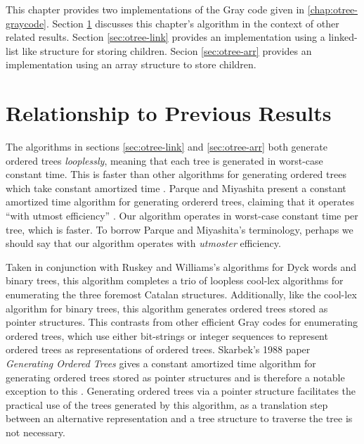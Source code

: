 This chapter provides two implementations of the Gray code given in \ref{chap:otree-graycode}.  
Section \ref{sec:relationship-loopless} discusses this chapter's algorithm in the context of other related results.  Section \ref{sec:otree-link} provides an implementation using a linked-list like structure for storing children.  Secion \ref{sec:otree-arr} provides an implementation using an array structure to store children.  


\section{Relationship to Previous Results}\label{sec:relationship-loopless}
The algorithms in sections \ref{sec:otree-link} and \ref{sec:otree-arr} both generate ordered trees \emph{looplessly}, meaning that each tree is generated in worst-case constant time.  This is faster than other algorithms for generating ordered trees which take constant amortized time \cite{parque2021efficient} \cite{er1985lexotrees} \cite{zaks1980lexotrees} \cite{skarbek1988pointerotrees}. Parque and Miyashita present a constant amortized time algorithm for generating ordererd trees, claiming that it operates ``with utmost efficiency'' \cite{parque2021efficient}.  Our algorithm operates in worst-case constant time per tree, which is faster. To borrow Parque and Miyashita's terminology, perhaps we should say that our algorithm operates with \emph{utmoster} efficiency. 

Taken in conjunction with Ruskey and Williams's algorithms for Dyck words and binary trees, this algorithm completes a trio of loopless cool-lex algorithms for enumerating the three foremost Catalan structures.  
Additionally, like the cool-lex algorithm for binary trees, this algorithm generates ordered trees stored as pointer structures.  This contrasts from other efficient Gray codes for enumerating ordered trees, which use either bit-strings or integer sequences to represent ordered trees \cite{parque2021efficient} \cite{zaks1980lexotrees} \cite{er1985lexotrees} as representations of ordered trees.  Skarbek's 1988 paper \emph{Generating Ordered Trees} gives a constant amortized time algorithm for generating ordered trees stored as pointer structures and is therefore a notable exception to this \cite{skarbek1988pointerotrees}.
Generating ordered trees via a pointer structure facilitates the practical %
use of the trees generated by this algorithm, as a translation step between an alternative representation and a tree structure to traverse the tree is not necessary.

